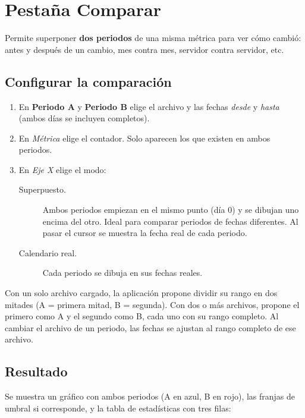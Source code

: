 \documentclass[11pt,a4paper,oneside]{report}
\newcommand{\campo}[1]{\textsf{\textit{#1}}}
\begin{document}
\chapter{Pestaña Comparar}

Permite superponer \textbf{dos periodos} de una misma métrica para ver cómo
cambió: antes y después de un cambio, mes contra mes, servidor contra
servidor, etc.

\section{Configurar la comparación}

\begin{enumerate}
  \item En \textbf{Periodo A} y \textbf{Periodo B} elige el archivo y las
        fechas \emph{desde} y \emph{hasta} (ambos días se incluyen completos).
  \item En \campo{Métrica} elige el contador. Solo aparecen los que existen en
        ambos periodos.
  \item En \campo{Eje X} elige el modo:
    \begin{description}
      \item[Superpuesto.] Ambos periodos empiezan en el mismo punto (día 0)
        y se dibujan uno encima del otro. Ideal para comparar periodos de
        fechas diferentes. Al pasar el cursor se muestra la fecha real de cada
        periodo.
      \item[Calendario real.] Cada periodo se dibuja en sus fechas reales.
    \end{description}
\end{enumerate}

\begin{nota}
Con un solo archivo cargado, la aplicación propone dividir su rango en dos
mitades (A = primera mitad, B = segunda). Con dos o más archivos, propone el
primero como A y el segundo como B, cada uno con su rango completo. Al
cambiar el archivo de un periodo, las fechas se ajustan al rango completo de
ese archivo.
\end{nota}

\section{Resultado}

Se muestra un gráfico con ambos periodos (A en azul, B en rojo), las franjas
de umbral si corresponde, y la tabla de estadísticas con tres filas:
\end{document}
